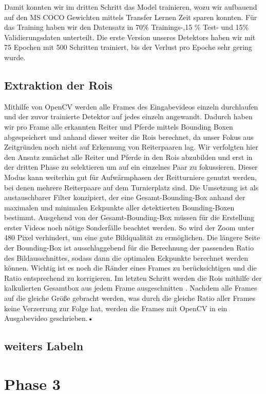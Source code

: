 Damit konnten wir im dritten Schritt das Model trainieren, wozu wir aufbauend auf den MS COCO Gewichten mittels Transfer Lernen Zeit sparen konnten. Für das Training haben wir den Datensatz in 70\% Trainings-,15 \% Test- und 15\% Validierungsdaten unterteilt. Die erste Version unseres Detektors haben wir mit 75 Epochen mit 500 Schritten trainiert, bis der Verlust pro Epoche sehr gering wurde.

\subsection{Extraktion der Rois}

Mithilfe von OpenCV werden alle Frames des Eingabevideos einzeln durchlaufen und der zuvor trainierte Detektor auf jedes einzeln angewandt. Dadurch haben wir pro Frame alle erkannten Reiter und Pferde mittels Bounding Boxen abgespeichert und anhand dieser weiter die Rois berechnet, da unser Fokus aus Zeitgründen noch nicht auf Erkennung von Reiterpaaren lag. Wir verfolgten hier den Ansatz zunächst alle Reiter und Pferde in den Rois abzubilden und erst in der dritten Phase zu selektieren um auf ein einzelnes Paar zu fokussieren. Dieser Modus kann weiterhin gut für Aufwärmphasen der Reitturniere genutzt werden, bei denen mehrere Reiterpaare auf dem Turnierplatz sind. Die Umsetzung ist als austauschbarer Filter konzipiert, der eine Gesamt-Bounding-Box anhand der maximalen und minimalen Eckpunkte aller detektierten Bounding-Boxen bestimmt.
Ausgehend von der Gesamt-Bounding-Box müssen für die Erstellung erster Videos noch nötige Sonderfälle beachtet werden. So wird der Zoom unter 480 Pixel verhindert, um eine gute Bildqualität zu ermöglichen. Die längere Seite der Bounding-Box ist ausschlaggebend für die Berechnung der passenden Ratio des Bildausschnittes, sodass dann die optimalen  Eckpunkte berechnet werden können. Wichtig ist es noch die Ränder eines Frames zu berücksichtigen und die Ratio entsprechend zu korrigieren.
Im letzten Schritt werden die Rois mithilfe der kalkulierten Gesamtbox aus jedem Frame ausgeschnitten  . Nachdem alle Frames auf die gleiche Größe gebracht werden, was durch die gleiche Ratio aller Frames keine Verzerrung zur Folge hat, werden die Frames mit OpenCV in ein Ausgabevideo geschrieben.•	

\subsection{weiters Labeln}


\section{Phase 3}

